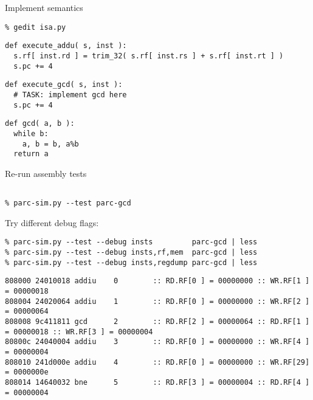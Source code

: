 \begin{task}
\begin{frame}[fragile]{Implement semantics}

\vspace{-15pt}

\begin{Verbatim}[commandchars=\\\{\}]
% cd \midtilde/pydgin-tut/parc
% gedit isa.py
\end{Verbatim}

\begin{lstlisting}[firstnumber=319]
def execute_addu( s, inst ):
  s.rf[ inst.rd ] = trim_32( s.rf[ inst.rs ] + s.rf[ inst.rt ] )
  s.pc += 4
\end{lstlisting}
\vspace{-10pt}
\begin{lstlisting}[firstnumber=976]
def execute_gcd( s, inst ):
  # TASK: implement gcd here
  s.pc += 4
\end{lstlisting}
\vspace{-10pt}
\begin{lstlisting}[numbers=none]
def gcd( a, b ):
  while b:
    a, b = b, a%b
  return a
\end{lstlisting}

\end{frame}
\end{task}


\begin{task}
\begin{frame}[fragile]{Re-run assembly tests}

\begin{Verbatim}[commandchars=\\\{\}]
% cd \midtilde/pydgin-tut/parc/asm_tests/build

% parc-sim.py --test parc-gcd
\end{Verbatim}

Try different debug flags:

{\small
\begin{verbatim}
% parc-sim.py --test --debug insts         parc-gcd | less
% parc-sim.py --test --debug insts,rf,mem  parc-gcd | less
% parc-sim.py --test --debug insts,regdump parc-gcd | less
\end{verbatim}}
{\tiny
\begin{verbatim}
808000 24010018 addiu    0        :: RD.RF[0 ] = 00000000 :: WR.RF[1 ] = 00000018
808004 24020064 addiu    1        :: RD.RF[0 ] = 00000000 :: WR.RF[2 ] = 00000064
808008 9c411811 gcd      2        :: RD.RF[2 ] = 00000064 :: RD.RF[1 ] = 00000018 :: WR.RF[3 ] = 00000004
80800c 24040004 addiu    3        :: RD.RF[0 ] = 00000000 :: WR.RF[4 ] = 00000004
808010 241d000e addiu    4        :: RD.RF[0 ] = 00000000 :: WR.RF[29] = 0000000e
808014 14640032 bne      5        :: RD.RF[3 ] = 00000004 :: RD.RF[4 ] = 00000004
\end{verbatim}}
\end{frame}
\end{task}

